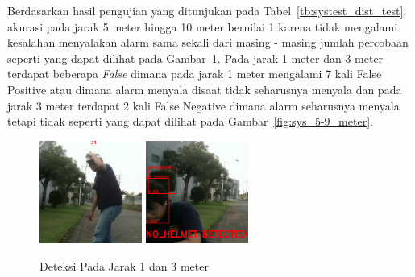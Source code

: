 \par Berdasarkan hasil pengujian yang ditunjukan pada Tabel~\ref{tb:systest_dist_test}, akurasi pada jarak 5 meter hingga 10 meter bernilai 1 karena tidak mengalami kesalahan menyalakan alarm sama sekali dari masing - masing jumlah percobaan seperti yang dapat dilihat pada Gambar~\ref{fig:sys_1-3_meter}. Pada jarak 1 meter dan 3 meter terdapat beberapa \emph{False} dimana pada jarak 1 meter mengalami 7 kali False Positive atau dimana alarm menyala disaat tidak seharusnya menyala dan pada jarak 3 meter terdapat 2 kali False Negative dimana alarm seharusnya menyala tetapi tidak seperti yang dapat dilihat pada Gambar~\ref{fig:sys_5-9_meter}.

\begin{figure} [h]
    \centering
    \includegraphics[width=0.3\textwidth]{gambar/sistem_jarak/1-3_jelek/jarak_helmet_white (21).png}
    \includegraphics[width=0.3\textwidth]{gambar/sistem_jarak/1-3_jelek/jaraknohelmet (1).png}
    \caption{Deteksi Pada Jarak 1 dan 3 meter}
    \label{fig:sys_1-3_meter}  
\end{figure}

